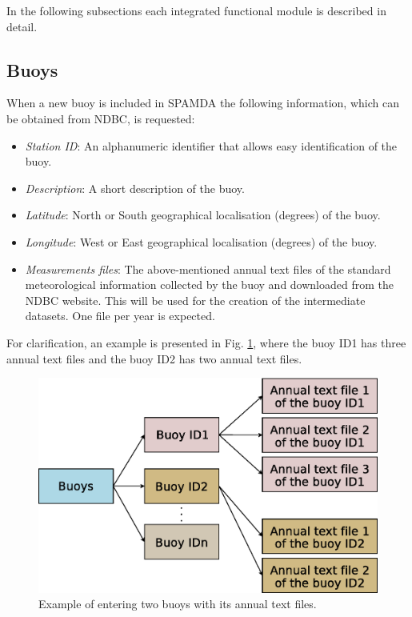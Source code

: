\documentclass[energies,article,submit,moreauthors,pdftex]{Definitions/mdpi}
\begin{document}
		In the following subsections each integrated functional module is described in detail.

			\subsection{Buoys}\label{sec:Buoys}
			
				When a new buoy is included in SPAMDA the following information, which can be obtained from NDBC, is requested:
				\begin{itemize}
					\item \textit{Station ID}: An alphanumeric identifier that allows easy identification of the buoy.
					\item \textit{Description}: A short description of the buoy.
					\item \textit{Latitude}: North or South geographical localisation (degrees) of the buoy.
					\item \textit{Longitude}: West or East geographical localisation (degrees) of the buoy.
					\item \textit{Measurements files}: The above-mentioned annual text files of the standard meteorological information collected by the buoy and downloaded from the NDBC website. This will be used for the creation of the intermediate datasets. One file per year is expected.
				\end{itemize}
				
				For clarification, an example is presented in Fig. \ref{fig:buoys}, where the buoy ID1 has three annual text files and the buoy ID2 has two annual text files.
				
				\begin{figure}[ht!]
					\centering
					\includegraphics[scale=0.42]{figures/FigureBuoys.eps}
					\caption{Example of entering two buoys with its annual text files.}
					\label{fig:buoys}
				\end{figure}
\end{document}
